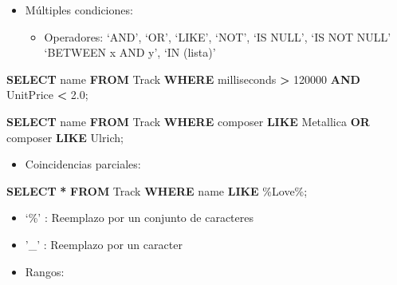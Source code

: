 \documentclass[
]{book}
\newenvironment{Shaded}{\begin{snugshade}}{\end{snugshade}}
\newcommand{\DecValTok}[1]{\textcolor[rgb]{0.00,0.00,0.81}{#1}}
\newcommand{\FloatTok}[1]{\textcolor[rgb]{0.00,0.00,0.81}{#1}}
\newcommand{\KeywordTok}[1]{\textcolor[rgb]{0.13,0.29,0.53}{\textbf{#1}}}
\newcommand{\NormalTok}[1]{#1}
\newcommand{\OperatorTok}[1]{\textcolor[rgb]{0.81,0.36,0.00}{\textbf{#1}}}
\newcommand{\StringTok}[1]{\textcolor[rgb]{0.31,0.60,0.02}{#1}}
\providecommand{\tightlist}{%
  \setlength{\itemsep}{0pt}\setlength{\parskip}{0pt}}
\begin{document}
\begin{itemize}
\item
  Múltiples condiciones:

  \begin{itemize}
  \tightlist
  \item
    Operadores: `AND', `OR', `LIKE', `NOT', `IS NULL', `IS NOT NULL'
    `BETWEEN x AND y', `IN (lista)'
  \end{itemize}
\end{itemize}

\begin{Shaded}
\begin{Highlighting}[]
  \KeywordTok{SELECT}\NormalTok{ name }\KeywordTok{FROM}\NormalTok{ Track}
  \KeywordTok{WHERE}\NormalTok{ milliseconds }\OperatorTok{\textgreater{}} \DecValTok{120000} \KeywordTok{AND}\NormalTok{ UnitPrice }\OperatorTok{\textless{}} \FloatTok{2.0}\NormalTok{; }
\end{Highlighting}
\end{Shaded}

\begin{Shaded}
\begin{Highlighting}[]
  \KeywordTok{SELECT}\NormalTok{ name }\KeywordTok{FROM}\NormalTok{ Track}
  \KeywordTok{WHERE}\NormalTok{ composer }\KeywordTok{LIKE} \StringTok{\textquotesingle{}Metallica\textquotesingle{}} \KeywordTok{OR}\NormalTok{ composer }\KeywordTok{LIKE} \StringTok{\textquotesingle{}Ulrich\textquotesingle{}}\NormalTok{; }
\end{Highlighting}
\end{Shaded}

\begin{itemize}
\tightlist
\item
  Coincidencias parciales:
\end{itemize}

\begin{Shaded}
\begin{Highlighting}[]
  \KeywordTok{SELECT} \OperatorTok{*} \KeywordTok{FROM}\NormalTok{ Track}
  \KeywordTok{WHERE}\NormalTok{ name }\KeywordTok{LIKE} \StringTok{\textquotesingle{}\%Love\%\textquotesingle{}}\NormalTok{; }
\end{Highlighting}
\end{Shaded}

\begin{itemize}
\item
  `\%' : Reemplazo por un conjunto de caracteres
\item
  '\_' : Reemplazo por un caracter
\item
  Rangos:
\end{itemize}
\end{document}
